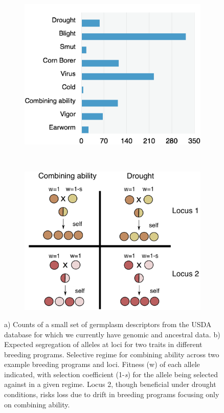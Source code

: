 \documentclass[12pt]{article}
\begin{document}
\begin{figure}[t]
        \begin{subfigure}[b]{0.5\textwidth}
                \includegraphics[width=\textwidth]{disease.png}
                \caption{}
                \label{fig:words}
        \end{subfigure}%
        ~ %
        \begin{subfigure}[b]{0.5\textwidth}
                \includegraphics[width=\textwidth]{divergent.png}
                \caption{}
                \label{fig:div}
        \end{subfigure}
\caption{a) Counts of a small set of germplasm descriptors from the USDA database for which we currently have genomic and ancestral data. b) Expected segregation of alleles at loci for two traits in different breeding programs.  Selective regime for combining ability across two example breeding programs and loci. Fitness (w) of each allele indicated, with selection coefficient (1-\textit{s}) for the allele being selected against in a given regime. Locus 2, though beneficial under drought conditions, risks loss due to drift in breeding programs focusing only on combining ability.}
\end{figure}
\end{document}
